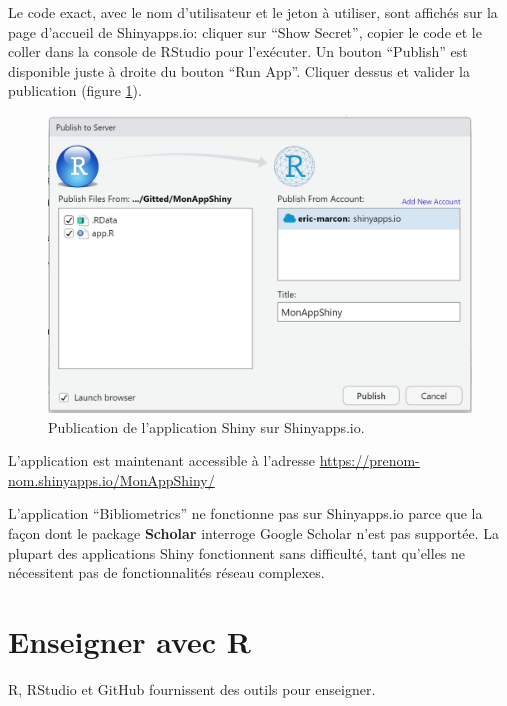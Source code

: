 \documentclass[
  12pt,
  french,
  a4paper,
  extrafontsizes,onecolumn,openright
  ]{memoir}
\begin{document}
\normalsize

Le code exact, avec le nom d'utilisateur et le jeton à utiliser, sont affichés sur la page d'accueil de Shinyapps.io: cliquer sur \enquote{Show Secret}, copier le code et le coller dans la console de RStudio pour l'exécuter.
Un bouton \enquote{Publish} est disponible juste à droite du bouton \enquote{Run App}.
Cliquer dessus et valider la publication (figure \ref{fig:shiny-publish}).



\scriptsize

\begin{figure}

{\centering \includegraphics[width=0.8\linewidth]{images/shiny-publish} 

}

\caption{Publication de l'application Shiny sur Shinyapps.io.}\label{fig:shiny-publish}
\end{figure}

\normalsize

L'application est maintenant accessible à l'adresse \url{https://prenom-nom.shinyapps.io/MonAppShiny/}

L'application \enquote{Bibliometrics} ne fonctionne pas sur Shinyapps.io parce que la façon dont le package \textbf{Scholar} interroge Google Scholar n'est pas supportée.
La plupart des applications Shiny fonctionnent sans difficulté, tant qu'elles ne nécessitent pas de fonctionnalités réseau complexes.

\hypertarget{chap:enseigner}{%
\chapter{Enseigner avec R}\label{chap:enseigner}}

R, RStudio et GitHub fournissent des outils pour enseigner.
\end{document}
